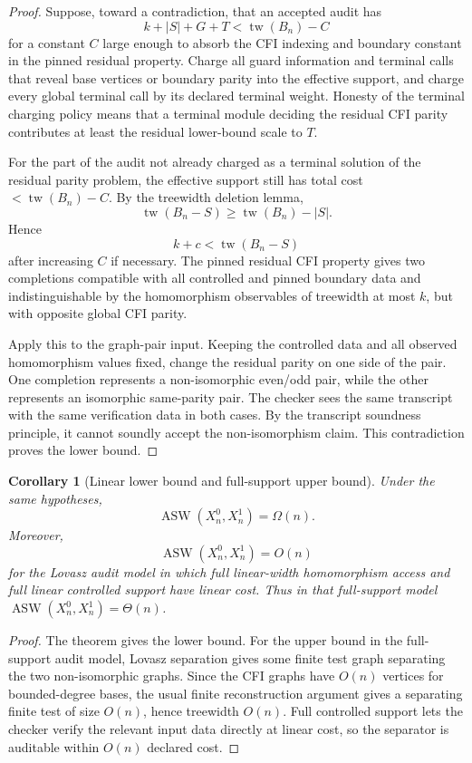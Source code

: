 \documentclass[11pt]{article}
\newtheorem{corollary}[theorem]{Corollary}
\theoremstyle{definition}
\DeclareMathOperator{\ASW}{ASW}
\DeclareMathOperator{\tw}{tw}
\begin{document}
\begin{proof}
Suppose, toward a contradiction, that an accepted audit has
\[
k+|S|+G+T<\tw(B_n)-C
\]
for a constant \(C\) large enough to absorb the CFI indexing and boundary constant in the pinned residual property. Charge all guard information and terminal calls that reveal base vertices or boundary parity into the effective support, and charge every global terminal call by its declared terminal weight. Honesty of the terminal charging policy means that a terminal module deciding the residual CFI parity contributes at least the residual lower-bound scale to \(T\).

For the part of the audit not already charged as a terminal solution of the residual parity problem, the effective support still has total cost \(<\tw(B_n)-C\). By the treewidth deletion lemma,
\[
\tw(B_n-S)\geq \tw(B_n)-|S|.
\]
Hence
\[
k+c<\tw(B_n-S)
\]
after increasing \(C\) if necessary. The pinned residual CFI property gives two completions compatible with all controlled and pinned boundary data and indistinguishable by the homomorphism observables of treewidth at most \(k\), but with opposite global CFI parity.

Apply this to the graph-pair input. Keeping the controlled data and all observed homomorphism values fixed, change the residual parity on one side of the pair. One completion represents a non-isomorphic even/odd pair, while the other represents an isomorphic same-parity pair. The checker sees the same transcript with the same verification data in both cases. By the transcript soundness principle, it cannot soundly accept the non-isomorphism claim. This contradiction proves the lower bound.
\end{proof}

\begin{corollary}[Linear lower bound and full-support upper bound]
Under the same hypotheses,
\[
\ASW(X_n^0,X_n^1)=\Omega(n).
\]
Moreover,
\[
\ASW(X_n^0,X_n^1)=O(n)
\]
for the Lovasz audit model in which full linear-width homomorphism access and full linear controlled support have linear cost. Thus in that full-support model \(\ASW(X_n^0,X_n^1)=\Theta(n)\).
\end{corollary}

\begin{proof}
The theorem gives the lower bound. For the upper bound in the full-support audit model, Lovasz separation gives some finite test graph separating the two non-isomorphic graphs. Since the CFI graphs have \(O(n)\) vertices for bounded-degree bases, the usual finite reconstruction argument gives a separating finite test of size \(O(n)\), hence treewidth \(O(n)\). Full controlled support lets the checker verify the relevant input data directly at linear cost, so the separator is auditable within \(O(n)\) declared cost.
\end{proof}
\end{document}
